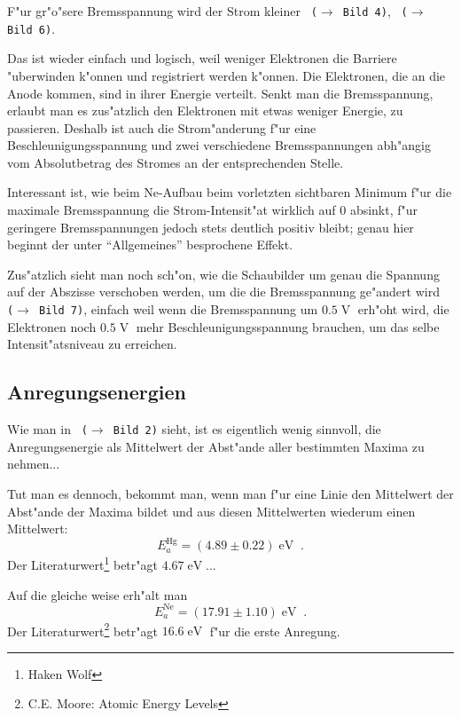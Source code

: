 \documentclass[a4paper,12pt]{article}
\newcommand{\abs}[0]{\bigskip\noindent}
\newcommand{\bild}[1]{\texttt{ ($\rightarrow$ Bild #1)}}
\begin{document}
F"ur gr"o"sere Bremsspannung wird der Strom kleiner \bild 4, \bild 6. 

Das ist wieder einfach und logisch, weil weniger Elektronen die
Barriere "uberwinden k"onnen und registriert werden k"onnen. Die
Elektronen, die an die Anode kommen, sind in ihrer Energie
verteilt. Senkt man die Bremsspannung, erlaubt man es zus"atzlich den
Elektronen mit etwas weniger Energie, zu passieren. Deshalb ist auch
die Strom"anderung f"ur eine Beschleunigungsspannung und zwei
verschiedene Bremsspannungen abh"angig vom Absolutbetrag des Stromes
an der entsprechenden Stelle.

Interessant ist, wie beim Ne-Aufbau beim vorletzten sichtbaren Minimum
f"ur die maximale Bremsspannung die Strom-Intensit"at wirklich auf $0$
absinkt, f"ur geringere Bremsspannungen jedoch stets deutlich positiv
bleibt; genau hier beginnt der unter "`Allgemeines"' besprochene Effekt.



\abs
Zus"atzlich sieht man noch sch"on, wie die Schaubilder um genau die
Spannung auf der Abszisse verschoben werden, um die die Bremsspannung
ge"andert wird \bild 7, einfach weil wenn die Bremsspannung um
$0.5\operatorname{V}$ erh"oht wird, die Elektronen noch
$0.5\operatorname{V}$ mehr Beschleunigungsspannung brauchen, um das
selbe Intensit"atsniveau zu erreichen.






\subsection*{Anregungsenergien}
\label{sec:anregungsenergien}

Wie man in \bild 2 sieht, ist es eigentlich wenig sinnvoll, die
Anregungsenergie als Mittelwert der Abst"ande aller bestimmten Maxima
zu nehmen...

Tut man es dennoch, bekommt man, wenn man f"ur eine Linie den
Mittelwert der
Abst"ande der Maxima bildet und aus diesen Mittelwerten wiederum einen
Mittelwert:
\begin{equation}
  \label{eq:2}
  E_a^\text{Hg} = (4.89 \pm 0.22) \operatorname{eV} \;.
\end{equation}
Der Literaturwert\footnote{Haken Wolf} betr"agt $4.67\operatorname{eV}$...

Auf die gleiche weise erh"alt man
\begin{equation}
  \label{eq:3}
  E_a^\text{Ne} = (17.91 \pm 1.10)\operatorname{eV} \;.
\end{equation}
Der Literaturwert\footnote{C.E. Moore: Atomic Energy Levels} betr"agt
$16.6\operatorname{eV}$ f"ur die erste Anregung.
\end{document}
